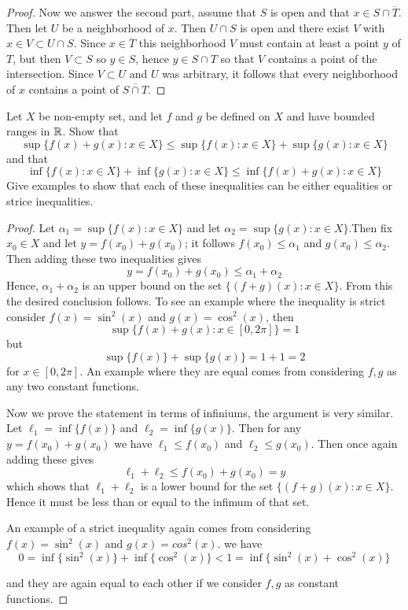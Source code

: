 \begin{alphaparts}
\begin{proof}
Now we answer the second part, assume that $S$ is open and that $x \in S \cap \overline{T}$. Then let $U$ be a neighborhood of $x$. Then $U \cap S$ is open and there exist 
$V$ with $x \in V \subset U \cap S$. Since $x \in \overline{T}$ this neighborhood $V$ must contain at least a point $y$ of $T$, but then $V \subset S$ so $y \in S$, hence 
$y \in S \cap T$ so that $V$ contains a point of the intersection. Since $V \subset U$ and $U$ was arbitrary, it follows that every neighborhood of $x$ contains a point of $\overline{S \cap T}$.  
\end{proof}

\end{alphaparts}

\question 
Let $X$ be non-empty set, and let $f$ and $g$ be defined on $X$ and have bounded ranges in $\mathbb{R}$. Show that 
\[\sup\{f(x) + g(x) : x \in X\} \leq \sup\{f(x) : x \in X\} + \sup\{g(x) : x \in X\} \]
and that 
\[ \inf\{f(x) : x \in X\} + \inf\{g(x) : x \in X \} \leq \inf\{f(x) + g(x) : x \in X\}\]
Give examples to show that each of these inequalities can be either equalities or strice inequalities. 

\begin{proof}
Let $\alpha_1 = \sup\{f(x) : x \in  X\} $ and let $\alpha_2  = \sup\{g(x) : x \in X\}$.Then fix $x_0 \in X$ and let $y = f(x_0) + g(x_0)$; it follows $f(x_0) \leq \alpha_1$ and $g(x_0) \leq \alpha_2$. Then adding these two inequalities gives 
\[ y = f(x_0) + g(x_0) \leq \alpha_1 + \alpha_2 \]
	Hence, $\alpha_1 + \alpha_2$ is an upper bound on the set $\{(f+g)(x) : x \in X\}$. From this the desired conclusion follows. To see an example where the inequality is strict consider $f(x) = \sin^2(x) $ and $g(x) =\cos^2(x)$, then 
	\[\sup \{f(x) + g(x) : x \in [0, 2\pi] \} = 1 \] 
but 
	\[\sup \{f(x)\} + \sup\{g(x) \} = 1 + 1 = 2 \] 
for $x \in [0, 2\pi]$. An example where they are equal comes from considering $f,g$ as any two constant functions. 

Now we prove the statement in terms of infiniums, the argument is very similar. Let 
	$\ell_1 = \inf\{f(x)  \}$ and $\ell_2 = \inf \{g(x)\}$. 
Then for any $y = f(x_0) + g(x_0)$ we have $\ell_1 \leq f(x_0)$ and $\ell_2 \leq g(x_0)$. Then once again adding these gives 
	\[\ell_1 + \ell_2 \leq f(x_0) + g(x_0) = y \] 
which shows that $\ell_1 + \ell_2$ is a lower bound for the set $\{(f + g)(x) : x \in X\}$. Hence it must be less than or equal to the infimum of that set. 

	An example of a strict inequality again comes from considering $f(x) = \sin^2(x) $ and $g(x) = cos^2(x)$. we have 
\[0 = \inf\{\sin^2(x)\} + \inf\{\cos^2(x)\} < 1 = \inf\{\sin^2(x) + \cos^2(x)\}\]

and they are again equal to each other if we consider $f,g$ as constant functions.
\end{proof}

